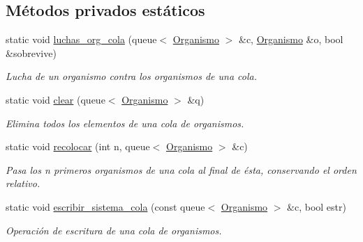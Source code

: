 \subsection*{Métodos privados estáticos}
\begin{DoxyCompactItemize}
\item 
static void \hyperlink{class_sistema_a9123a18225eece5cf29d0d59067ac509}{luchas\+\_\+org\+\_\+cola} (queue$<$ \hyperlink{class_organismo}{Organismo} $>$ \&c, \hyperlink{class_organismo}{Organismo} \&o, bool \&sobrevive)
\begin{DoxyCompactList}\small\item\em Lucha de un organismo contra los organismos de una cola. \end{DoxyCompactList}\item 
static void \hyperlink{class_sistema_afaa4f1c2cce4c63faf03ee01265f5320}{clear} (queue$<$ \hyperlink{class_organismo}{Organismo} $>$ \&q)
\begin{DoxyCompactList}\small\item\em Elimina todos los elementos de una cola de organismos. \end{DoxyCompactList}\item 
static void \hyperlink{class_sistema_a251ac725ddac0022e4845faec14004ef}{recolocar} (int n, queue$<$ \hyperlink{class_organismo}{Organismo} $>$ \&c)
\begin{DoxyCompactList}\small\item\em Pasa los n primeros organismos de una cola al final de ésta, conservando el orden relativo. \end{DoxyCompactList}\item 
static void \hyperlink{class_sistema_aa5e14a3c6ccd53bf61020d69e03b136d}{escribir\+\_\+sistema\+\_\+cola} (const queue$<$ \hyperlink{class_organismo}{Organismo} $>$ \&c, bool estr)
\begin{DoxyCompactList}\small\item\em Operación de escritura de una cola de organismos. \end{DoxyCompactList}\end{DoxyCompactItemize}
